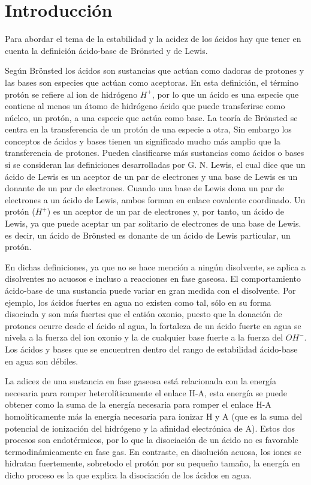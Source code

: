 \chapter{Introducción}

Para abordar el tema de la estabilidad y la acidez de los ácidos hay que tener en cuenta la definición ácido-base de Brönsted y de Lewis. 

Según Brönsted los ácidos son sustancias que actúan como dadoras de protones y las bases son especies que actúan como aceptoras. En esta definición, el término protón se refiere al ion de hidrógeno $H^+$, por lo que un ácido es una especie que contiene al menos un átomo de hidrógeno ácido que puede transferirse como núcleo, un protón, a una especie que actúa como base. La teoría de Brönsted se centra en la transferencia de un protón de una especie a otra, Sin embargo los conceptos de ácidos y bases tienen un significado mucho más amplio que la transferencia de protones. Pueden clasificarse más sustancias como ácidos o bases si se consideran las definiciones desarrolladas por G. N. Lewis, el cual dice que un ácido de Lewis es un aceptor de un par de electrones y una base de Lewis es un donante de un par de electrones. Cuando una base de Lewis dona un par de electrones a un ácido de Lewis, ambos forman en enlace covalente coordinado. Un protón ($H^+$) es un aceptor de un par de electrones y, por tanto, un ácido de Lewis, ya que puede aceptar un par solitario de electrones de una base de Lewis. es decir, un ácido de Brönsted es donante de un ácido de Lewis particular, un protón. \cite{quimica7}

En dichas definiciones, ya que no se hace mención a ningún disolvente, se aplica a disolventes no acuosos e incluso a reacciones en fase gaseosa. El comportamiento ácido-base de una sustancia puede variar en gran medida con el disolvente. Por ejemplo, los ácidos fuertes en agua no existen como tal, sólo en su forma disociada y son más fuertes que el catión oxonio, puesto que la donación de protones ocurre desde el ácido al agua, la fortaleza de un ácido fuerte en agua se nivela a la fuerza del ion oxonio y la de cualquier base fuerte a la fuerza del $OH ^-$. Los ácidos y bases que se encuentren dentro del rango de estabilidad ácido-base en agua son débiles. \cite {quimica1}

La adicez de una sustancia en fase gaseosa está relacionada con la energía necesaria para romper heterolíticamente el enlace H-A, esta energía se puede obtener como la suma de la energía necesaria para romper el enlace H-A homolíticamente más la energía necesaria para ionizar H y A (que es la suma del potencial de ionización del hidrógeno y la afinidad electrónica de A). Estos dos procesos son endotérmicos, por lo que la disociación de un ácido no es favorable termodinámicamente en fase gas. En contraste, en disolución acuosa, los iones se hidratan fuertemente, sobretodo el protón por su pequeño tamaño, la energía en dicho proceso es la que explica la disociación de los ácidos en agua.


